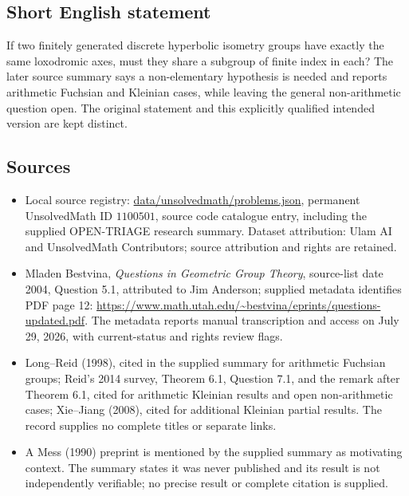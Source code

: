\documentclass[11pt]{article}
\begin{document}
\subsection{Short English statement}
If two finitely generated discrete hyperbolic isometry groups have exactly the same loxodromic axes, must they share a subgroup of finite index in each? The later source summary says a non-elementary hypothesis is needed and reports arithmetic Fuchsian and Kleinian cases, while leaving the general non-arithmetic question open. The original statement and this explicitly qualified intended version are kept distinct.
\subsection{Sources}
\begin{itemize}
\item Local source registry: \url{data/unsolvedmath/problems.json}, permanent UnsolvedMath ID $1100501$, source code catalogue entry, including the supplied OPEN-TRIAGE research summary. Dataset attribution: Ulam AI and UnsolvedMath Contributors; source attribution and rights are retained.
\item Mladen Bestvina, \emph{Questions in Geometric Group Theory}, source-list date 2004, Question 5.1, attributed to Jim Anderson; supplied metadata identifies PDF page 12: \url{https://www.math.utah.edu/~bestvina/eprints/questions-updated.pdf}. The metadata reports manual transcription and access on July 29, 2026, with current-status and rights review flags.
\item Long--Reid (1998), cited in the supplied summary for arithmetic Fuchsian groups; Reid's 2014 survey, Theorem 6.1, Question 7.1, and the remark after Theorem 6.1, cited for arithmetic Kleinian results and open non-arithmetic cases; Xie--Jiang (2008), cited for additional Kleinian partial results. The record supplies no complete titles or separate links.
\item A Mess (1990) preprint is mentioned by the supplied summary as motivating context. The summary states it was never published and its result is not independently verifiable; no precise result or complete citation is supplied.
\end{itemize}
\end{document}
